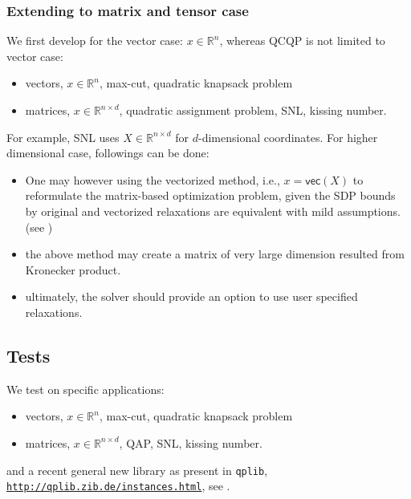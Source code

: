 \documentclass[../main]{subfiles}
\begin{document}
\subsubsection{Extending to matrix and tensor case}\label{sdp-extending}

We first develop for the vector case: $x \in \mathbb R^n$, whereas QCQP is not limited to vector case:

\begin{itemize}
  \item vectors, $x\in \mathbb {R}^n$, max-cut, quadratic knapsack problem
  \item matrices, $x\in \mathbb {R}^{n\times d}$, quadratic assignment problem, SNL, kissing number.
\end{itemize}

For example, SNL uses $X \in \mathbb R^{n\times d}$ for $d$-dimensional coordinates. For higher dimensional case, followings can be done:

\begin{itemize}
  \item One may however using the vectorized method, i.e., $x = \mathsf{vec}(X)$ to reformulate the matrix-based optimization problem, given the SDP bounds by original and vectorized relaxations are equivalent with mild assumptions. (see \cite{ding_equivalence_2011})
  \item the above method may create a matrix of very large dimension resulted from Kronecker product.
  \item ultimately, the solver should provide an option to use user specified relaxations.
\end{itemize}

\subsection{Tests}

We test on specific applications:


\begin{itemize}
  \item vectors, $x\in \mathbb {R}^n$, max-cut, quadratic knapsack problem
  \item matrices, $x\in \mathbb {R}^{n\times d}$, QAP, SNL, kissing number.
\end{itemize}

and a recent general new library as present in \texttt{qplib}, \underline{\texttt{http://qplib.zib.de/instances.html}}, see \cite{furini_qplib_2019}.
\end{document}
